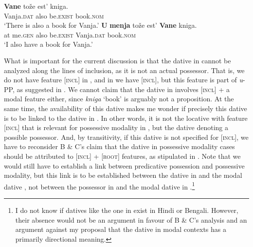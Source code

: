 \documentclass[output=paper,colorlinks,citecolor=brown,modfonts,nonflat]{langsci/langscibook}
\begin{document}
\ea%
    \label{ex:tsedryk:13}
    \ea\label{ex:tsedryk:13a}
    \gll    \textbf{Vane}         {tože}    {est’}           {kniga.}\\
            Vanja.\textsc{dat}   also   be.\textsc{exist}   book.\textsc{nom}\\
    \glt    ‘There is also a book for Vanja.’
    \ex\label{ex:tsedryk:13b}
    \gll    \textbf{U} \textbf{menja}     {tože}   {est’}           \textbf{{Vane}}         {kniga.}\\
            at me.\textsc{gen}    also   be.\textsc{exist}   Vanja.\textsc{dat}   book.\textsc{nom}\\
    \glt    ‘I also have a book for Vanja.’
    \z
\z

What is important for the current discussion is that the dative in  cannot be analyzed along the lines of inclusion, as it is not an actual possessor. That is, we do not have feature [\textsc{incl}] in , and in  we have [\textsc{incl}], but this feature is part of \textit{u}{}-PP, as suggested in . We cannot claim that the dative in  involves [\textsc{incl}] + a modal feature either, since \textit{kniga} ‘book’ is arguably not a proposition. At the same time, the availability of this dative makes me wonder if precisely this dative is to be linked to the dative in . In other words, it is not the locative with feature [\textsc{incl}] that is relevant for possessive modality in , but the dative denoting a possible possessor. And, by transitivity, if this dative is not specified for [\textsc{incl}], we have to reconsider B \& C’s claim that the dative in possessive modality cases should be attributed to [\textsc{incl}] + [\textsc{root}] features, as stipulated in . Note that we would still have to establish a link between predicative possession and possessive modality, but this link is to be established between the dative in  and the modal dative , not between the possessor in  and the modal dative in .\footnote{I do not know if datives like the one in  exist in Hindi or Bengali. However, their absence would not be an argument in favour of B \& C’s analysis and an argument against my proposal that the dative in modal contexts has a primarily directional meaning.}   
\end{document}
